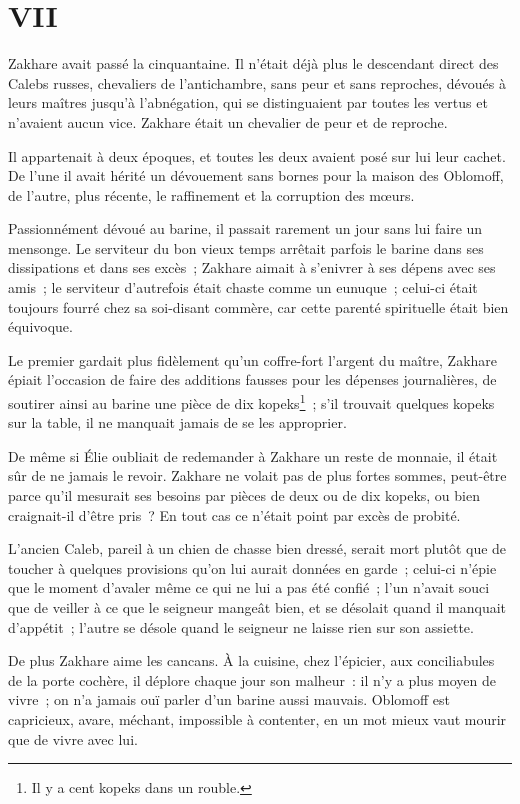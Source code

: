 \documentclass[french,twoside]{book} %
\begin{document}
\section[{VII}]{VII}\renewcommand{\leftmark}{VII}

\noindent Zakhare avait passé la cinquantaine. Il n’était déjà plus le descendant direct des Calebs russes, chevaliers de l’antichambre, sans peur et sans reproches, dévoués à leurs maîtres jusqu’à l’abnégation, qui se distinguaient par toutes les vertus et n’avaient aucun vice. Zakhare était un chevalier de peur et de reproche.\par
Il appartenait à deux époques, et toutes les deux avaient posé sur lui leur cachet. De l’une il avait hérité un dévouement sans bornes pour la maison des Oblomoff, de l’autre, plus récente, le raffinement et la corruption des mœurs.\par
Passionnément dévoué au barine, il passait rarement un jour sans lui faire un mensonge. Le serviteur du bon vieux temps arrêtait parfois le barine dans ses dissipations et dans ses excès ; Zakhare aimait à s’enivrer à ses dépens avec ses amis ; le serviteur d’autrefois était chaste comme un eunuque ; celui-ci était toujours fourré chez sa soi-disant commère, car cette parenté spirituelle était bien équivoque.\par
Le premier gardait plus fidèlement qu’un coffre-fort l’argent du maître, Zakhare épiait l’occasion de faire des additions fausses pour les dépenses journalières, de soutirer ainsi au barine une pièce de dix kopeks\footnote{Il y a cent kopeks dans un rouble.} ; s’il trouvait quelques kopeks sur la table, il ne manquait jamais de se les approprier.\par
De même si Élie oubliait de redemander à Zakhare un reste de monnaie, il était sûr de ne jamais le revoir. Zakhare ne volait pas de plus fortes sommes, peut-être parce qu’il mesurait ses besoins par pièces de deux ou de dix kopeks, ou bien craignait-il d’être pris ? En tout cas ce n’était point par excès de probité.\par
L’ancien Caleb, pareil à un chien de chasse bien dressé, serait mort plutôt que de toucher à quelques provisions qu’on lui aurait données en garde ; celui-ci n’épie que le moment d’avaler même ce qui ne lui a pas été confié ; l’un n’avait souci que de veiller à ce que le seigneur mangeât bien, et se désolait quand il manquait d’appétit ; l’autre se désole quand le seigneur ne laisse rien sur son assiette.\par
De plus Zakhare aime les cancans. À la cuisine, chez l’épicier, aux conciliabules de la porte cochère, il déplore chaque jour son malheur : il n’y a plus moyen de vivre ; on n’a jamais ouï parler d’un barine aussi mauvais. Oblomoff est capricieux, avare, méchant, impossible à contenter, en un mot mieux vaut mourir que de vivre avec lui.\par
\end{document}
